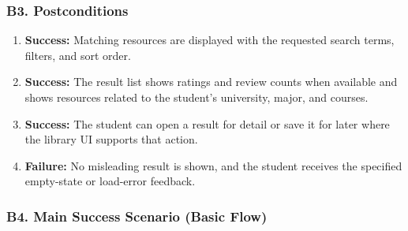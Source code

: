 \documentclass[12pt]{article}
\begin{document}
\hypertarget{sec:b3-postconditions}{}
\subsubsection*{B3. Postconditions}
\par\medskip

\begin{enumerate}
\item \textbf{Success:} Matching resources are displayed with the requested search terms, filters, and sort order.
\item \textbf{Success:} The result list shows ratings and review counts when available and shows resources related to the student's university, major, and courses.
\item \textbf{Success:} The student can open a result for detail or save it for later where the library UI supports that action.
\item \textbf{Failure:} No misleading result is shown, and the student receives the specified empty-state or load-error feedback.
\end{enumerate}
\par\medskip

\hypertarget{sec:b4-main-success-scenario-basic-flow}{}
\subsubsection*{B4. Main Success Scenario (Basic Flow)}
\par\medskip
\end{document}
